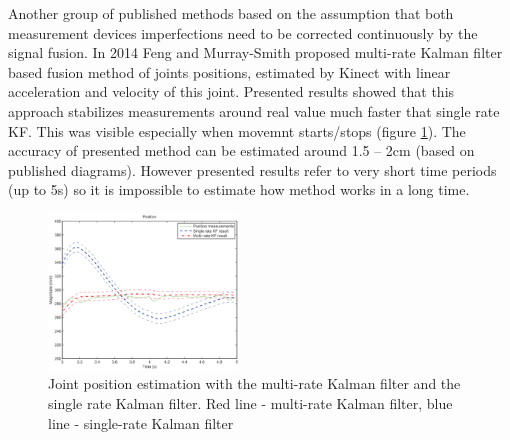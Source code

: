 \documentclass[9pt]{llncs}
\begin{document}
Another group of published methods based on the assumption that both measurement devices imperfections need to be corrected continuously by the signal fusion. In 2014 Feng and Murray-Smith \cite{Murray-Smith2014} proposed multi-rate Kalman filter based fusion method of joints positions, estimated by Kinect with linear acceleration and velocity of this joint. Presented results showed that this approach stabilizes measurements around real value much faster that single rate KF. This was visible especially when movemnt starts/stops (figure \ref{fig:feng-Stabilization}). The accuracy of presented method can be estimated around 1.5 -- 2cm (based on published diagrams). However presented results refer to very short time periods (up to 5s) so it is impossible to estimate how method works in a long time.\\

\begin{figure}[!htb]
	\centering 
	\includegraphics[width=0.45\textwidth]{Fig03.eps}
	\caption{Joint position estimation with the multi-rate Kalman filter and the single rate Kalman filter\cite{Murray-Smith2014}. Red line - multi-rate Kalman filter, blue line - single-rate Kalman filter}
	\label{fig:feng-Stabilization}
\end{figure}
\end{document}
